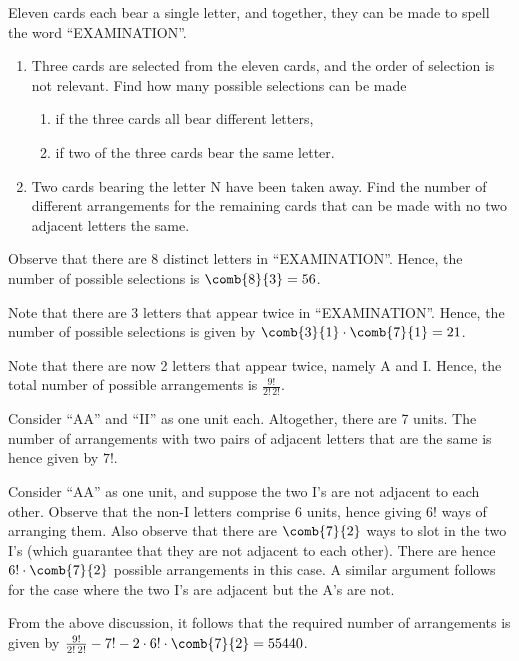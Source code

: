\begin{problem}
    Eleven cards each bear a single letter, and together, they can be made to spell the word ``EXAMINATION''.
    \begin{enumerate}
        \item Three cards are selected from the eleven cards, and the order of selection is not relevant. Find how many possible selections can be made
        \begin{enumerate}
            \item if the three cards all bear different letters,
            \item if two of the three cards bear the same letter.
        \end{enumerate}
        \item Two cards bearing the letter N have been taken away. Find the number of different arrangements for the remaining cards that can be made with no two adjacent letters the same.
    \end{enumerate}
\end{problem}
\begin{solution}
    \begin{ppart}
        \begin{psubpart}
            Observe that there are 8 distinct letters in ``EXAMINATION''. Hence, the number of possible selections is $\comb{8}{3} = 56$.
        \end{psubpart}
        \begin{psubpart}
            Note that there are 3 letters that appear twice in ``EXAMINATION''. Hence, the number of possible selections is given by $\comb{3}{1} \cdot  \comb{7}{1} = 21$.
        \end{psubpart}
    \end{ppart}
    \begin{ppart}
        Note that there are now 2 letters that appear twice, namely A and I. Hence, the total number of possible arrangements is $\frac{9!}{2! \, 2!}$.

        Consider ``AA'' and ``II'' as one unit each. Altogether, there are 7 units. The number of arrangements with two pairs of adjacent letters that are the same is hence given by $7!$. 
        
        Consider ``AA'' as one unit, and suppose the two I's are not adjacent to each other. Observe that the non-I letters comprise 6 units, hence giving $6!$ ways of arranging them. Also observe that there are $\comb{7}{2}$ ways to slot in the two I's (which guarantee that they are not adjacent to each other). There are hence $6! \cdot \comb{7}{2}$ possible arrangements in this case. A similar argument follows for the case where the two I's are adjacent but the A's are not.

        From the above discussion, it follows that the required number of arrangements is given by $\frac{9!}{2! \, 2!} - 7! - 2 \cdot 6! \cdot \comb{7}{2} = 55440$.
    \end{ppart}
\end{solution}

